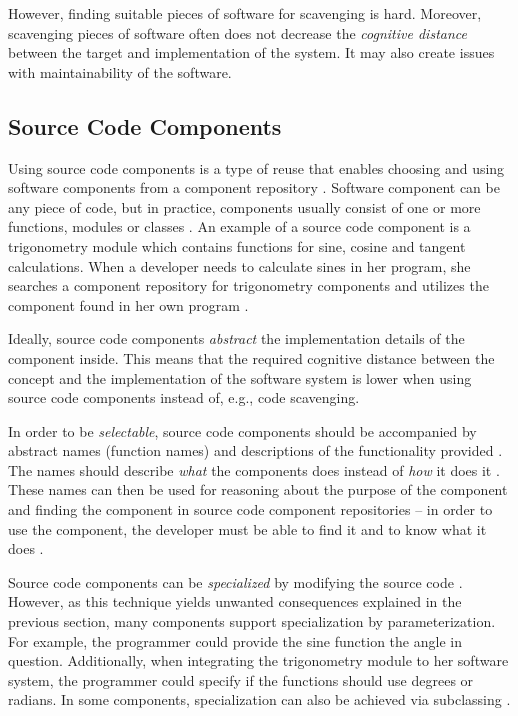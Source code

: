 However, finding suitable pieces of software for scavenging is hard. Moreover, scavenging pieces of software often does not decrease the \emph{cognitive distance} between the target and implementation of the system. It may also create issues with maintainability of the software. \citep[chap.~4]{krueger_software_1992}

\subsection{Source Code Components}

Using source code components is a type of reuse that enables choosing and using software components from a component repository \citep[chap.~3]{sametinger_software_1997}. Software component can be any piece of code, but in practice, components usually consist of one or more functions, modules or classes \citep[chap.~3]{sametinger_software_1997}. An example of a source code component is a trigonometry module which contains functions for sine, cosine and tangent calculations. When a developer needs to calculate sines in her program, she searches a component repository for trigonometry components and utilizes the component found in her own program \citep[chap.~5]{krueger_software_1992}.

Ideally, source code components \emph{abstract} the implementation details of the component inside. This means that the required cognitive distance between the concept and the implementation of the software system is lower when using source code components instead of, e.g., code scavenging. 

In order to be \emph{selectable}, source code components should be accompanied by abstract names (function names) and descriptions of the functionality provided \citep[chap.~5]{krueger_software_1992}. The names should describe \emph{what} the components does instead of \emph{how} it does it \citep[chap.~5]{krueger_software_1992}. These names can then be used for reasoning about the purpose of the component and finding the component in source code component repositories -- in order to use the component, the developer must be able to find it and to know what it does \citep[chap.~5]{krueger_software_1992}.

Source code components can be \emph{specialized} by modifying the source code \citet[chap.~5]{krueger_software_1992}. However, as this technique yields unwanted consequences explained in the previous section, many components support specialization by parameterization. For example, the programmer could provide the sine function the angle in question. Additionally, when integrating the trigonometry module to her software system, the programmer could specify if the functions should use degrees or radians. In some components, specialization can also be achieved via subclassing \citep[chap.~5]{krueger_software_1992}.

